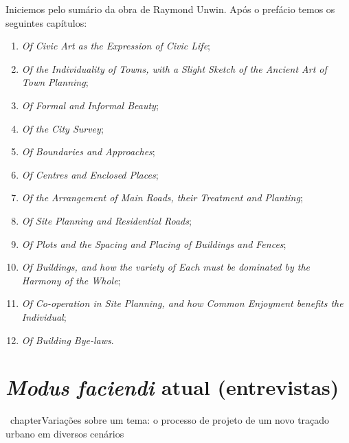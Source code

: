 \documentclass[]{report}
\begin{document}
	Iniciemos pelo sumário da obra de Raymond Unwin. Após o prefácio temos os seguintes capítulos:
	\begin{enumerate}
		\item \textit{Of Civic Art as the Expression of Civic Life};
		\item \textit{Of the Individuality of Towns, with a Slight Sketch of the Ancient Art of Town Planning};
		\item \textit{Of Formal and Informal Beauty};
		\item \textit{Of the City Survey};
		\item \textit{Of Boundaries and Approaches};
		\item \textit{Of Centres and Enclosed Places};
		\item \textit{Of the Arrangement of Main Roads, their Treatment and Planting};
		\item \textit{Of Site Planning and Residential Roads};
		\item \textit{Of Plots and the Spacing and Placing of Buildings and Fences};
		\item \textit{Of Buildings, and how the variety of Each must be dominated by the Harmony of the Whole};
		\item \textit{Of Co-operation in Site Planning, and how Common Enjoyment benefits the Individual};
		\item \textit{Of Building Bye-laws}.
	\end{enumerate}
	
	\chapter{\textit{Modus faciendi} atual (entrevistas)}

	\	chapter{Variações sobre um tema: o processo de projeto de um novo traçado urbano em diversos cenários}
\end{document}
